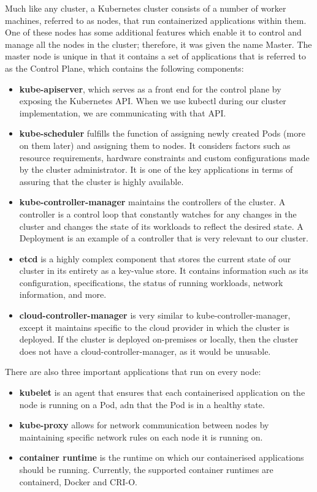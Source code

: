 \documentclass[thesis=B,english]{FITthesis}[2019/12/23]
\begin{document}
Much like any cluster, a Kubernetes cluster consists of a number of worker machines, referred to as nodes, that run containerized applications within them. One of these nodes has some additional features which enable it to control and manage all the nodes in the cluster; therefore, it was given the name Master. The master node is unique in that it contains a set of applications that is referred to as the Control Plane, which contains the following components:

\begin{itemize}
  \setlength\itemsep{0em}
  \item \textbf{kube-apiserver}, which serves as a front end for the control plane by exposing the Kubernetes API. When we use kubectl during our cluster implementation, we are communicating with that API.
  \item \textbf{kube-scheduler} fulfills the function of assigning newly created Pods (more on them later) and assigning them to nodes. It considers factors such as resource requirements, hardware constraints and custom configurations made by the cluster administrator. It is one of the key applications in terms of assuring that the cluster is highly available.
  \item \textbf{kube-controller-manager} maintains the controllers of the cluster. A controller is a control loop that constantly watches for any changes in the cluster and changes the state of its workloads to reflect the desired state. A Deployment is an example of a controller that is very relevant to our cluster.
  \item \textbf{etcd} is a highly complex component that stores the current state of our cluster in its entirety as a key-value store. It contains information such as its configuration, specifications, the status of running workloads, network information, and more. \cite{etcd}
  \item \textbf{cloud-controller-manager} is very similar to kube-controller-manager, except it maintains specific to the cloud provider in which the cluster is deployed. If the cluster is deployed on-premises or locally, then the cluster does not have a cloud-controller-manager, as it would be unusable.
\end{itemize}

There are also three important applications that run on every node:

\begin{itemize}
  \setlength\itemsep{0em}
  \item \textbf{kubelet} is an agent that ensures that each containerised application on the node is running on a Pod, adn that the Pod is in a healthy state.
  \item \textbf{kube-proxy} allows for network communication between nodes by maintaining specific network rules on each node it is running on.
  \item \textbf{container runtime} is the runtime on which our containerised applications should be running. Currently, the supported container runtimes are containerd, Docker and CRI-O.
\end{itemize}
\end{document}
